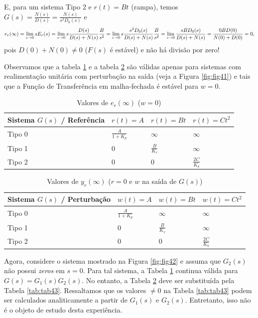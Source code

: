 \documentclass[
]{book}
\begin{document}
E, para um sistema Tipo 2 e \(r(t) = Bt\) (rampa), temos \(G(s) = \frac{N(s)}{D(s)} = \frac{N(s)}{s^2D_0(s)}\) e
\[
e_r(\infty) = \lim\limits_{s \to 0}{sE_r(s) = \lim\limits_{s \to 0}{s\frac{D(s)}{D(s)+N(s)}\frac{B}{s^2}}} = \lim\limits_{s \to 0}{s\frac{s^2D_0(s)}{D(s)+N(s)}\frac{B}{s^2}}\\
=\lim\limits_{s \to 0}{\frac{sBD_0(s)}{D(s)+N(s)}}=\frac{0BD(0)}{N(0)+D(0)}=0,
\]
pois \(D(0) + N(0) \neq 0\) (\(F(s)\) é estável) e não há divisão por zero!

Observamos que a tabela \ref{tab:tab41} e a tabela \ref{tab:tab42} são válidas apenas para sistemas com realimentação unitária com perturbação na saída (veja a Figura \ref{fig:fig41}) e tais que a Função de Transferência em malha-fechada é estável para \(w=0\).

\begin{table}

\caption{\label{tab:tab41}Valores de $e_r(\infty)$ ($w=0$)}
\centering
\begin{tabular}[t]{llll}
\toprule
Sistema $G(s)$ / Referência & $r(t)=A$ & $r(t) = Bt$ & $r(t) = Ct^2$\\
\midrule
Tipo 0 & $\frac{A}{1 + K_p}$ & $\infty$ & $\infty$\\
Tipo 1 & 0 & $\frac{B}{K_v}$ & $\infty$\\
Tipo 2 & 0 & 0 & $\frac{2C}{K_a}$\\
\bottomrule
\end{tabular}
\end{table}

\begin{table}

\caption{\label{tab:tab42}Valores de $y_r(\infty)$ ($r=0$ e $w$ na saída de $G(s)$)}
\centering
\begin{tabular}[t]{llll}
\toprule
Sistema $G(s)$ / Perturbação & $w(t)=A$ & $w(t) = Bt$ & $w(t) = Ct^2$\\
\midrule
Tipo 0 & $\frac{A}{1 + K_p}$ & $\infty$ & $\infty$\\
Tipo 1 & 0 & $\frac{B}{K_v}$ & $\infty$\\
Tipo 2 & 0 & 0 & $\frac{2C}{K_a}$\\
\bottomrule
\end{tabular}
\end{table}

Agora, considere o sistema mostrado na Figura \ref{fig:fig42} e assuma que \(G_2(s)\) não possui \emph{zeros} em \(s=0\). Para tal sistema, a Tabela \ref{tab:tab41} continua válida para \(G(s) = G_1(s)G_2(s)\). No entanto, a Tabela \ref{tab:tab42} deve ser substituída pela Tabela \ref{tab:tab43}. Ressaltamos que os valores \(\neq 0\) na Tabela \ref{tab:tab43} podem ser calculados analiticamente a partir de \(G_1(s) \text{ e } G_2(s)\). Entretanto, isso não é o objeto de estudo desta experiência.
\end{document}
